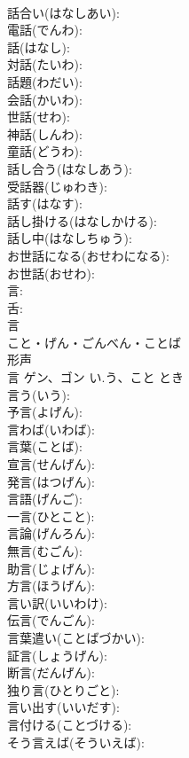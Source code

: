 \documentclass[8pt]{extreport}
\begin{document}
\begin{CJK}{UTF8}{min}
\\	話合い(はなしあい): 
\\	電話(でんわ): 
\\	話(はなし): 
\\	対話(たいわ): 
\\	話題(わだい): 
\\	会話(かいわ): 
\\	世話(せわ): 
\\	神話(しんわ): 
\\	童話(どうわ): 
\\	話し合う(はなしあう): 
\\	受話器(じゅわき): 
\\	話す(はなす): 
\\	話し掛ける(はなしかける): 
\\	話し中(はなしちゅう): 
\\	お世話になる(おせわになる): 
\\	お世話(おせわ): 
\\	言: 
\\	舌: 
\\	言	
\\	こと・げん・ごんべん・ことば	
\\	形声 
\\	言	ゲン、ゴン	い.う、こと	とき	
\\	言う(いう): 
\\	予言(よげん): 
\\	言わば(いわば): 
\\	言葉(ことば): 
\\	宣言(せんげん): 
\\	発言(はつげん): 
\\	言語(げんご): 
\\	一言(ひとこと): 
\\	言論(げんろん): 
\\	無言(むごん): 
\\	助言(じょげん): 
\\	方言(ほうげん): 
\\	言い訳(いいわけ): 
\\	伝言(でんごん): 
\\	言葉遣い(ことばづかい): 
\\	証言(しょうげん): 
\\	断言(だんげん): 
\\	独り言(ひとりごと): 
\\	言い出す(いいだす): 
\\	言付ける(ことづける): 
\\	そう言えば(そういえば): 

\end{CJK}
\end{document}
